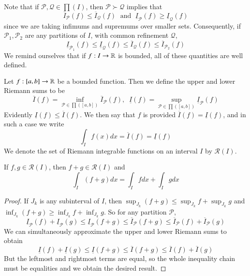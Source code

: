 Note that if $\mathcal{P},\mathcal{Q} \in \prod(I)$, then $\mathcal{P}\succ\mathcal{Q}$ implies that $$\overline{I}_{\mathcal{P}}(f) \leq \overline{I}_{\mathcal{Q}}(f)\; \text{ and }\; \underline{I}_{\mathcal{P}}(f) \geq \underline{I}_{\mathcal{Q}}(f)$$
since we are taking infimums and supremums over smaller sets. Consequently, if $\mathcal{P}_1,\mathcal{P}_2$ are any partitions of $I$, with common refinement $\mathcal{Q}$, $$\underline{I}_{\mathcal{P}_1}(f) \leq \underline{I}_{\mathcal{Q}}(f) \leq \overline{I}_{\mathcal{Q}}(f) \leq \overline{I}_{\mathcal{P}_2}(f)$$
We remind ourselves that if $f:I\rightarrow \mathbb R$ is bounded, all of these quantities are well defined.

\begin{definition}
    Let $f:[a,b]\rightarrow \mathbb R$ be a bounded function. Then we define the upper and lower Riemann sums to be $$\overline{I}(f) = \inf_{\mathcal{P} \in \prod([a,b])}\overline{I}_{\mathcal{P}}(f),\;\;\underline{I}(f) = \sup_{\mathcal{P} \in \prod([a,b])}\underline{I}_{\mathcal{P}}(f)$$
    Evidently $\underline{I}(f)\leq \overline{I}(f)$. We then say that $f$ is  provided $\overline{I}(f) = \underline{I}(f)$, and in such a case we write $$\int_If(x)dx = \overline{I}(f) = \underline{I}(f)$$
    We denote the set of Riemann integrable functions on an interval $I$ by $\mathcal{R}(I)$.
\end{definition}

\begin{proposition}
    If $f,g \in \mathcal{R}(I)$, then $f+g \in \mathcal{R}(I)$ and $$\int_I(f+g)dx = \int_Ifdx + \int_Igdx$$
\end{proposition}
\begin{proof}
    If $J_k$ is any subinterval of $I$, then $\sup_{J_k}(f+g) \leq \sup_{J_k}f+\sup_{J_k}g$ and $\inf_{J_k}(f+g) \geq \inf_{J_k}f+\inf_{J_k}g$. So for any partition $\mathcal{P}$, $$\underline{I}_{\mathcal{P}}(f) + \underline{I}_{\mathcal{P}}(g) \leq \underline{I}_{\mathcal{P}}(f+g) \leq \overline{I}_{\mathcal{P}}(f+g) \leq \overline{I}_{\mathcal{P}}(f)+\overline{I}_{\mathcal{P}}(g)$$ We can simultaneously approximate the upper and lower Riemann sums to obtain $$\underline{I}(f) + \underline{I}(g) \leq \underline{I}(f+g) \leq \overline{I}(f+g) \leq \overline{I}(f)+\overline{I}(g)$$ But the leftmost and rightmost terms are equal, so the whole inequality chain must be equalities and we obtain the desired result.
\end{proof}

